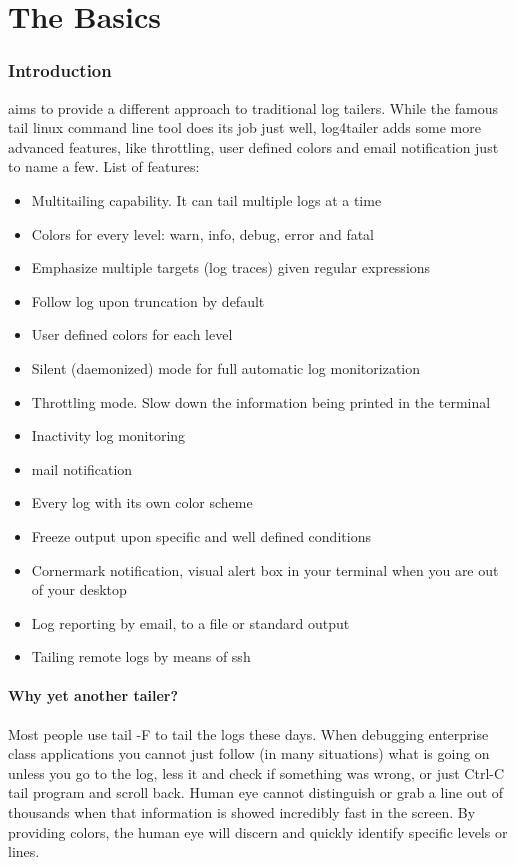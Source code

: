 \part{The Basics}
\section{Introduction}
\logftailer{} aims to provide a different approach to traditional log tailers.
While the famous tail linux
command line tool does its job just well, log4tailer adds
some more advanced features, like throttling, user defined colors and email notification just 
to name a few. 
List of features:

\begin{itemize}
 \item Multitailing capability. It can tail multiple logs at a time
 \item Colors for every level: warn, info, debug, error and fatal
 \item Emphasize multiple targets (log traces) given regular expressions
 \item Follow log upon truncation by default
 \item User defined colors for each level
 \item Silent (daemonized) mode for full automatic log monitorization
 \item Throttling mode. Slow down the information being printed in the terminal 
 \item Inactivity log monitoring
 \item mail notification
 \item Every log with its own color scheme
 \item Freeze output upon specific and well defined conditions
 \item Cornermark notification, visual alert box in your terminal when you are out of your desktop
 \item Log reporting by email, to a file or standard output
 \item Tailing remote logs by means of ssh
 
\end{itemize}

\subsection{Why yet another tailer?}

Most people use tail -F to tail the logs these days. When debugging enterprise
class applications you cannot just follow (in many situations) what is going on
unless you go to the log, less it and check if something was wrong, or just
Ctrl-C tail program and scroll back. Human eye cannot distinguish or grab a line
out of thousands when that information is showed incredibly fast in the screen.
By providing colors, the human eye will discern and quickly identify specific
levels or lines. 

